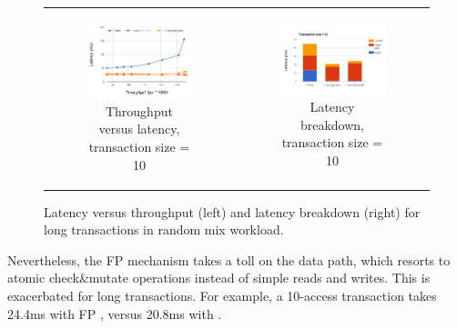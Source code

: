 \begin{figure}[t]
\begin{tabular}{cc}
    \begin{subfigure}[t]{0.5\textwidth}
	\includegraphics[width=\textwidth]{figs/thpt-latency-10.png}
	\caption[]{Throughput versus latency, transaction size = 10}
    \label{fig:tl-10}
  \end{subfigure} &
  
  \begin{subfigure}[t]{0.5\textwidth}
	\includegraphics[width=.9\textwidth]{figs/stack-tx10.png}
	\caption[]{Latency breakdown, transaction size = 10}
    \label{fig:stack-tx10}
  \end{subfigure} 
\end{tabular}  			
  \caption{Latency versus throughput (left) and latency breakdown (right) for long transactions in random mix workload. }
  \label{fig:throughput-latency}
\end{figure}

Nevertheless,
the FP mechanism takes a toll on the data path, which resorts to atomic check\&mutate operations 
instead of simple reads and writes. This is exacerbated for long transactions. 
For example, a 10-access transaction takes 24.4ms with FP \sys, 
versus 20.8ms with \sys. 

